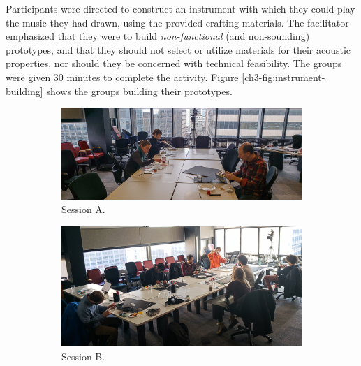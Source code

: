 \documentclass[letterpaper, 12pt]{article}
\begin{document}
Participants were directed to construct an instrument with which they could play the music they had drawn, using the provided crafting materials. The facilitator emphasized that they were to build \emph{non-functional} (and non-sounding) prototypes, and that they should not select or utilize materials for their acoustic properties, nor should they be concerned with technical feasibility. The groups were given 30 minutes to complete the activity. Figure \ref{ch3-fig:instrument-building} shows the groups building their prototypes.

\begin{figure}[t]
    \centering
    \begin{subfigure}[]{1\textwidth}
        \centering
        \includegraphics[width=1\textwidth]{ch3_dfp_nfp_A.jpg}
        \caption{Session A.}
    \end{subfigure}
    \par\bigskip
    \begin{subfigure}[]{0.59\textwidth}
        \centering
        \includegraphics[width=1\textwidth]{ch3_dfp_nfp_B.jpg}
        \caption{Session B.}
    \end{subfigure}
    \begin{subfigure}[]{0.4\textwidth}
        \centering

\end{subfigure}
\end{figure}
\end{document}
